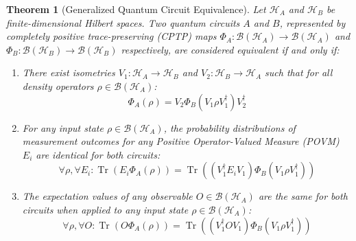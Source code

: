 \documentclass[11pt,a4paper]{article}
\newtheorem{theorem}{Theorem}
\DeclareMathOperator{\Tr}{Tr}
\begin{document}
\begin{theorem}[Generalized Quantum Circuit Equivalence]
\label{thm:gen_equiv}
Let $\mathcal{H}_A$ and $\mathcal{H}_B$ be finite-dimensional Hilbert spaces. Two quantum circuits $A$ and $B$, represented by completely positive trace-preserving (CPTP) maps $\Phi_A: \mathcal{B}(\mathcal{H}_A) \to \mathcal{B}(\mathcal{H}_A)$ and $\Phi_B: \mathcal{B}(\mathcal{H}_B) \to \mathcal{B}(\mathcal{H}_B)$ respectively, are considered equivalent if and only if:
\begin{enumerate}
\item There exist isometries $V_1: \mathcal{H}_A \to \mathcal{H}_B$ and $V_2: \mathcal{H}_B \to \mathcal{H}_A$ such that for all density operators $\rho \in \mathcal{B}(\mathcal{H}_A)$:
\begin{equation}
\Phi_A(\rho) = V_2 \Phi_B(V_1 \rho V_1^\dagger) V_2^\dagger
\end{equation}
\item For any input state $\rho \in \mathcal{B}(\mathcal{H}_A)$, the probability distributions of measurement outcomes for any Positive Operator-Valued Measure (POVM) ${E_i}$ are identical for both circuits:
\begin{equation}
\forall \rho, \forall {E_i}: \Tr(E_i \Phi_A(\rho)) = \Tr((V_1^\dagger E_i V_1) \Phi_B(V_1 \rho V_1^\dagger))
\end{equation}
\item The expectation values of any observable $O \in \mathcal{B}(\mathcal{H}_A)$ are the same for both circuits when applied to any input state $\rho \in \mathcal{B}(\mathcal{H}_A)$:
\begin{equation}
\forall \rho, \forall O: \Tr(O \Phi_A(\rho)) = \Tr((V_1^\dagger O V_1) \Phi_B(V_1 \rho V_1^\dagger))
\end{equation}
\end{enumerate}
\end{theorem}
\end{document}

